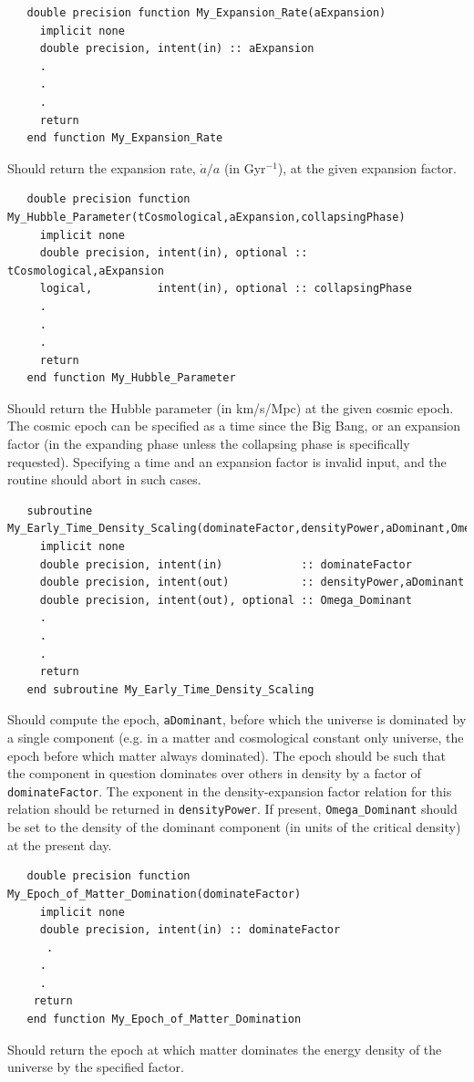 \begin{verbatim}
   double precision function My_Expansion_Rate(aExpansion)
     implicit none
     double precision, intent(in) :: aExpansion
     .
     .
     .
     return
   end function My_Expansion_Rate
\end{verbatim}
Should return the expansion rate, $\dot{a}/a$ (in Gyr$^{-1}$), at the given expansion factor.

\begin{verbatim}
   double precision function My_Hubble_Parameter(tCosmological,aExpansion,collapsingPhase)
     implicit none
     double precision, intent(in), optional :: tCosmological,aExpansion
     logical,          intent(in), optional :: collapsingPhase
     .
     .
     .
     return
   end function My_Hubble_Parameter
\end{verbatim}
Should return the Hubble parameter (in km/s/Mpc) at the given cosmic epoch. The cosmic epoch can be specified as a time since the Big Bang, or an expansion factor (in the expanding phase unless the collapsing phase is specifically requested). Specifying a time and an expansion factor is invalid input, and the routine should abort in such cases.

\begin{verbatim}
   subroutine My_Early_Time_Density_Scaling(dominateFactor,densityPower,aDominant,Omega_Dominant)
     implicit none
     double precision, intent(in)            :: dominateFactor
     double precision, intent(out)           :: densityPower,aDominant
     double precision, intent(out), optional :: Omega_Dominant
     .
     .
     .
     return
   end subroutine My_Early_Time_Density_Scaling
\end{verbatim}
Should compute the epoch, {\tt aDominant}, before which the universe is dominated by a single component (e.g. in a matter and cosmological constant only universe, the epoch before which matter always dominated). The epoch should be such that the component in question dominates over others in density by a factor of {\tt dominateFactor}. The exponent in the density-expansion factor relation for this relation should be returned in {\tt densityPower}. If present, {\tt Omega\_Dominant} should be set to the density of the dominant component (in units of the critical density) at the present day.

\begin{verbatim}
   double precision function My_Epoch_of_Matter_Domination(dominateFactor)
     implicit none
     double precision, intent(in) :: dominateFactor
      .
     .
     .
    return
   end function My_Epoch_of_Matter_Domination
\end{verbatim}
Should return the epoch at which matter dominates the energy density of the universe by the specified factor.

